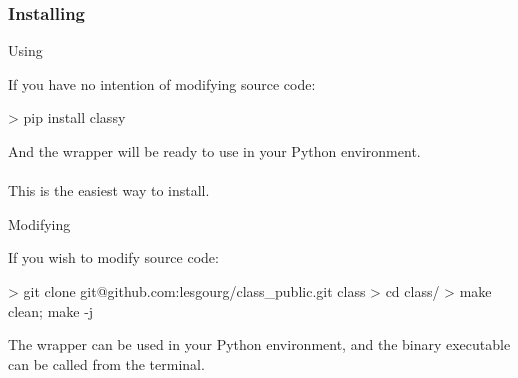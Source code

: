 \begin{frame}[fragile]
	\frametitle{Installing \CLASS{}}

	\begin{minipage}[t][0.8\textheight][t]{.45\textwidth}
      \begin{block}{Using \CLASS{}}
		\begin{minipage}[t][0.42\textheight][t]{\textwidth}
        If you have no intention of modifying source code:
		\begin{class}
> pip install classy
		\end{class}
		And the \CLASS{} wrapper will be ready to use in your Python environment.\\
		\\
		This is the easiest way to install.
		\end{minipage}
      \end{block}
	  \end{minipage}
	  \hfill
	\begin{minipage}[t][0.8\textheight][t]{.45\textwidth}
      \begin{block}{Modifying \CLASS{}}
		\begin{minipage}[t][0.42\textheight][t]{\textwidth}
		If you wish to modify source code:
        \begin{class}
> git clone git@github.com:lesgourg/class_public.git class
> cd class/
> make clean; make -j
		\end{class}
	  The wrapper can be used in your Python environment, and the binary executable can be called from the terminal.
	  \end{minipage}
      \end{block}
	  \end{minipage}

\end{frame}

